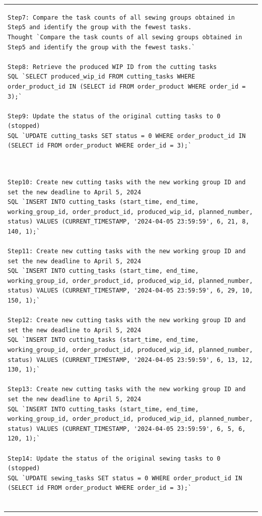 \documentclass[preprint,12pt]{elsarticle}
\begin{document}
\begin{center}
\begin{longtable}{p{390pt}}
\begin{lstlisting}[style=my_operation, label={lst:chain_of_operation}]
Step7: Compare the task counts of all sewing groups obtained in Step5 and identify the group with the fewest tasks.
Thought `Compare the task counts of all sewing groups obtained in Step5 and identify the group with the fewest tasks.`

Step8: Retrieve the produced WIP ID from the cutting tasks
SQL `SELECT produced_wip_id FROM cutting_tasks WHERE order_product_id IN (SELECT id FROM order_product WHERE order_id = 3);`

Step9: Update the status of the original cutting tasks to 0 (stopped)
SQL `UPDATE cutting_tasks SET status = 0 WHERE order_product_id IN (SELECT id FROM order_product WHERE order_id = 3);`

\end{lstlisting}\\
\begin{lstlisting}[style=my_operation, label={lst:chain_of_operation}]

Step10: Create new cutting tasks with the new working group ID and set the new deadline to April 5, 2024
SQL `INSERT INTO cutting_tasks (start_time, end_time, working_group_id, order_product_id, produced_wip_id, planned_number, status) VALUES (CURRENT_TIMESTAMP, '2024-04-05 23:59:59', 6, 21, 8, 140, 1);`

Step11: Create new cutting tasks with the new working group ID and set the new deadline to April 5, 2024
SQL `INSERT INTO cutting_tasks (start_time, end_time, working_group_id, order_product_id, produced_wip_id, planned_number, status) VALUES (CURRENT_TIMESTAMP, '2024-04-05 23:59:59', 6, 29, 10, 150, 1);`

Step12: Create new cutting tasks with the new working group ID and set the new deadline to April 5, 2024
SQL `INSERT INTO cutting_tasks (start_time, end_time, working_group_id, order_product_id, produced_wip_id, planned_number, status) VALUES (CURRENT_TIMESTAMP, '2024-04-05 23:59:59', 6, 13, 12, 130, 1);`

Step13: Create new cutting tasks with the new working group ID and set the new deadline to April 5, 2024
SQL `INSERT INTO cutting_tasks (start_time, end_time, working_group_id, order_product_id, produced_wip_id, planned_number, status) VALUES (CURRENT_TIMESTAMP, '2024-04-05 23:59:59', 6, 5, 6, 120, 1);`

Step14: Update the status of the original sewing tasks to 0 (stopped)
SQL `UPDATE sewing_tasks SET status = 0 WHERE order_product_id IN (SELECT id FROM order_product WHERE order_id = 3);`


\end{lstlisting}
\end{longtable}
\end{center}
\end{document}
